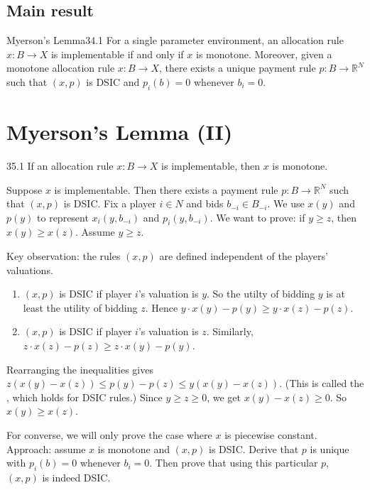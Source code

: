 \documentclass[12pt,letterpaper]{report}
\begin{document}
\subsection{Main result}

\begin{thm}{Myerson's Lemma}{34.1}
  For a single parameter environment, an allocation rule $x \colon B \to X$ is implementable if and
  only if $x$ is monotone.
  Moreover, given a monotone allocation rule $x \colon B \to X$, there exists a unique payment rule
  $p \colon B \to \mathbb{R}^N$ such that $(x, p)$ is DSIC and $p_i(b) = 0$ whenever $b_i = 0$.
\end{thm}

\section{Myerson's Lemma (II)}

\begin{lem}{}{35.1}
  If an allocation rule $x \colon B \to X$ is implementable, then $x$ is monotone.
\end{lem}

\begin{thmproof}
  Suppose $x$ is implementable.
  Then there exists a payment rule $p \colon B \to \mathbb{R}^N$ such that $(x, p)$ is DSIC.
  Fix a player $i \in N$ and bids $b_{-i} \in B_{-i}$.
  We use $x(y)$ and $p(y)$ to represent $x_i(y, b_{-i})$ and $p_i(y, b_{-i})$.
  We want to prove: if $y \geq z$, then $x(y) \geq x(z)$.
  Assume $y \geq z$.

  Key observation: the rules $(x, p)$ are defined independent of the players' valuations.
  \begin{enumerate}
    \item
    $(x, p)$ is DSIC if player $i$'s valuation is $y$.
    So the utilty of bidding $y$ is at least the utility of bidding $z$.
    Hence $y \cdot x(y) - p(y) \geq y \cdot x(z) - p(z)$.
    \item
    $(x, p)$ is DSIC if player $i$'s valuation is $z$.
    Similarly, $z \cdot x(z) - p(z) \geq z \cdot x(y) - p(y)$.
  \end{enumerate}
  Rearranging the inequalities gives $z(x(y) - x(z)) \leq p(y) - p(z) \leq y(x(y) - x(z))$.
  (This is called the , which holds for DSIC rules.)
  Since $y \geq z \geq 0$, we get $x(y) - x(z) \geq 0$.
  So $x(y) \geq x(z)$.
\end{thmproof}

For converse, we will only prove the case where $x$ is piecewise constant.
Approach: assume $x$ is monotone and $(x, p)$ is DSIC.
Derive that $p$ is unique with $p_i(b) = 0$ whenever $b_i = 0$.
Then prove that using this particular $p$, $(x, p)$ is indeed DSIC.
\end{document}
